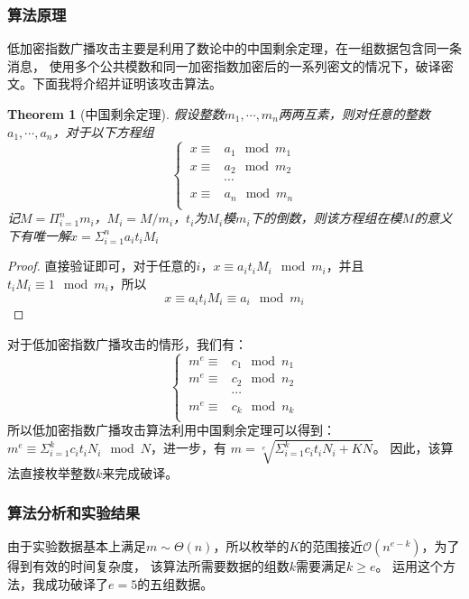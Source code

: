 \documentclass{ctexart}
\newtheorem{theorem}{Theorem}
\begin{document}
\subsubsection{算法原理}
低加密指数广播攻击主要是利用了数论中的中国剩余定理，在一组数据包含同一条消息，
使用多个公共模数和同一加密指数加密后的一系列密文的情况下，破译密文。下面我将介绍并证明该攻击算法。
\begin{theorem}[中国剩余定理]
    假设整数$m_1,\cdots,m_n$两两互素，则对任意的整数$a_1,\cdots,a_n$，对于以下方程组
    \begin{equation*}
        \begin{cases}
        \ x\equiv& a_1 \mod m_1\\
        \ x\equiv& a_2  \mod m_2 \\
        &\cdots\\
        \ x\equiv& a_n \mod m_n  \\
        \end{cases} 
    \end{equation*}
    记$M=\Pi_{i=1}^nm_i$，$M_i=M/m_i$，$t_i$为$M_i$模$m_i$下的倒数，则该方程组在模$M$的意义下有唯一解$x=\Sigma_{i=1}^na_it_iM_i$
\end{theorem}
\begin{proof}
    直接验证即可，对于任意的$i$，$x\equiv a_it_iM_i\mod m_i$，并且$t_iM_i\equiv 1 \mod m_i$，所以
    $$
    x\equiv a_it_iM_i\equiv a_i  \mod m_i
    $$
\end{proof}
对于低加密指数广播攻击的情形，我们有：
\begin{equation*}
    \begin{cases}
    \ m^e\equiv& c_1 \mod n_1\\
    \ m^e\equiv& c_2  \mod n_2 \\
    &\cdots\\
    \ m^e\equiv& c_k \mod n_k  \\
    \end{cases} 
\end{equation*}
所以低加密指数广播攻击算法利用中国剩余定理可以得到：
$m^e\equiv\Sigma_{i=1}^kc_it_iN_i\mod N$，进一步，有
$m=\sqrt[e]{\Sigma_{i=1}^kc_it_iN_i + KN}$。
因此，该算法直接枚举整数$k$来完成破译。
\subsubsection{算法分析和实验结果}
由于实验数据基本上满足$m\sim \Theta(n)$，所以枚举的$K$的范围接近$\mathcal{O}(n^{e-k})$，为了得到有效的时间复杂度，
该算法所需要数据的组数$k$需要满足$k\geqslant e $。
运用这个方法，我成功破译了$e=5$的五组数据。
\end{document}
